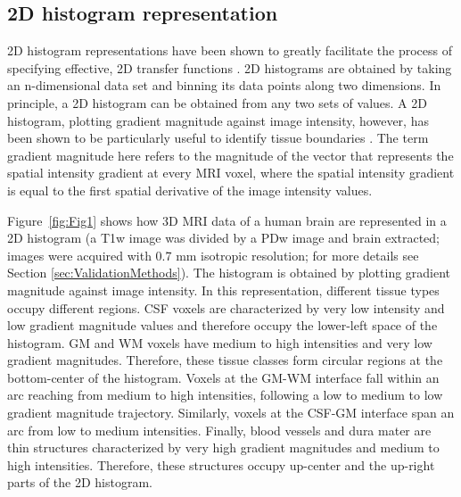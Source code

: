 \subsection{2D histogram representation}
2D histogram representations have been shown to greatly facilitate the process of specifying effective, 2D transfer functions \parencite{Kindlmann1998, Kniss2005}. 2D histograms are obtained by taking an n-dimensional data set and binning its data points along two dimensions. In principle, a 2D histogram can be obtained from any two sets of values. A 2D histogram, plotting gradient magnitude against image intensity, however, has been shown to be particularly useful to identify tissue boundaries \parencite{Kindlmann1998, Kniss2005}. The term gradient magnitude here refers to the magnitude of the vector that represents the spatial intensity gradient at every MRI voxel, where the spatial intensity gradient is equal to the first spatial derivative of the image intensity values.

Figure~\ref{fig:Fig1} shows how 3D MRI data of a human brain are represented in a 2D histogram (a T1w image was divided by a PDw image \parencite{Moortele2009} and brain extracted; images were acquired with 0.7 mm isotropic resolution; for more details see Section \ref{sec:ValidationMethods}). The histogram is obtained by plotting gradient magnitude against image intensity. In this representation, different tissue types occupy different regions. CSF voxels are characterized by very low intensity and low gradient magnitude values and therefore occupy the lower-left space of the histogram. GM and WM voxels have medium to high intensities and very low gradient magnitudes. Therefore, these tissue classes form circular regions at the bottom-center of the histogram. Voxels at the GM-WM interface fall within an arc reaching from medium to high intensities, following a low to medium to low gradient magnitude trajectory. Similarly, voxels at the CSF-GM interface span an arc from low to medium intensities. Finally, blood vessels and dura mater are thin structures characterized by very high gradient magnitudes and medium to high intensities. Therefore, these structures occupy up-center and the up-right parts of the 2D histogram.

